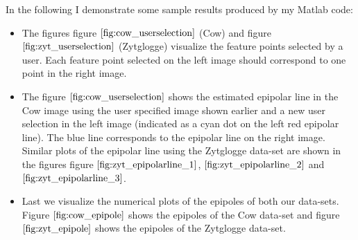 \documentclass{paper}
\begin{document}
In the following I demonstrate some sample results produced by my Matlab code:
\begin{itemize}
    \item The figures figure $\ref{fig:cow_userselection}$ (Cow) and figure $\ref{fig:zyt_userselection}$ (Zytglogge) visualize the feature points selected by a user. Each feature point selected on the left image should correspond to one point in the right image.
    \item The figure $\ref{fig:cow_userselection}$ shows the estimated epipolar line in the Cow image using the user specified image shown earlier and a new user selection in the left image (indicated as a cyan dot on the left red epipolar line). The blue line corresponds to the epipolar line on the right image. Similar plots of the epipolar line using the Zytglogge data-set are shown in the figures figure $\ref{fig:zyt_epipolarline_1}$, $\ref{fig:zyt_epipolarline_2}$ and $\ref{fig:zyt_epipolarline_3}$.
    \item Last we visualize the numerical plots of the epipoles of both our data-sets. Figure $\ref{fig:cow_epipole}$ shows the epipoles of the Cow data-set and figure $\ref{fig:zyt_epipole}$ shows the epipoles of the Zytglogge data-set.
\end{itemize}
\end{document}
